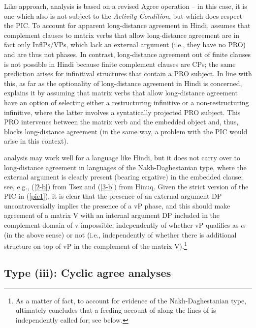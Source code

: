 \documentclass[output=paper
,modfonts
,nonflat]{langsci/langscibook}
\begin{document}
	Like  approach,  analysis is
	based on a revised Agree operation -- in this case, it is one which also is not
	subject to the {\itshape Activity Condition}, but which does respect the PIC.
	To account for apparent long-distance agreement in Hindi, \citet{Bhatt:05} assumes
	that complement clauses to  matrix verbs that allow long-distance agreement are in fact
	only InflPs/VPs, which lack an external argument (i.e., they have
	no PRO) and are thus not phases. In contrast, long-distance
	agreement out of finite clauses is not possible in Hindi because
	finite complement clauses are CPs; the same prediction arises
	for infinitival structures that contain a PRO subject. 
	In line with this, as far as the optionality of long-distance agreement in Hindi is
	concerned, 
	\citet{Bhatt:05} explains it by
	assuming that matrix verbs that allow long-distance agreement have an option of selecting
	either a restructuring infinitive or a non-restructuring infinitive, where the latter involves a syntatically projected PRO subject.
	This PRO intervenes between the matrix verb and the embedded
	object and, thus, blocks long-distance agreement (in the same way,
	a problem with the PIC would arise in this context). 
	
	 analysis may work well for a language like Hindi,
	but it does not carry over to long-distance agreement in languages of
	the Nakh-Daghestanian type, where the external argument is clearly
	present (bearing ergative) in the embedded clause; see, e.g.,
	(\ref{2-b}) from Tsez and (\ref{3-b}) from Hinuq. Given the strict version
	of the PIC in (\ref{pic1}), it is clear that the presence of an external
	argument DP uncontroversially implies the presence of a vP phase, and
	this should make agreement of a matrix V with an internal argument DP
	included in the complement domain of v impossible, independently of
	whether vP qualifies as $\alpha$ (in the above sense) or not (i.e.,
	independently of whether there is additional structure on top of vP in
	the complement of the matrix V).\footnote{As a matter of fact, to
		account for evidence of the Nakh-Daghestanian type, 
		\citet[791]{Bhatt:05} ultimately concludes that a feeding account of
		along the lines of \cite{PolinskyPotsdam:01}  is independently called
		for; see below.}
	
	\subsection{Type (iii): Cyclic agree analyses}
	
\end{document}
